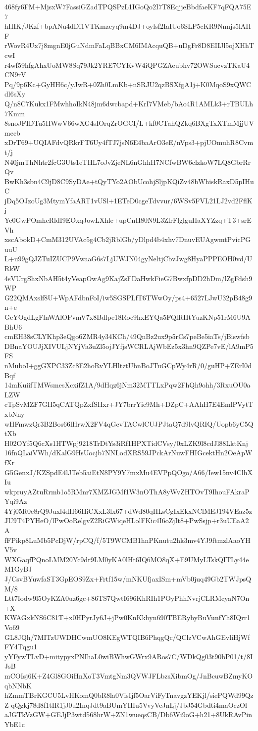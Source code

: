 468fy6FM+MjsxW7FassiGZadTPQSPzL1IGoQo2I7T8EqjjeBbdfaeKF7qFQA75E7
hHIK/JKzf+bpANu4dDi1VTKmzcyq9m4DJ+oylsf2IaIUo6SLP5cKR9Nnnjs5lAHF
rWovR4Ux7j8mgnE0jGuNdmFaLqBBxCM6IMAcquQB+uDgFr8D8EIIJl5ojXHhTcwI
r4wf59hfgAhxUoMW8Sq79Jk2YRE7CYKvW4iQPGZAeubhv72OWSucvzTKaU4CN9rV
Pq/9p6Kc+GyHH6c/yJwR+0Zh0LmKb+nSRJU2qzBSXfgA1j+K0MqoS9xQWCdl6sXy
Q/n8C7Kukx1FMwhhoIkN48jm6dwcbapd+KrI7VMeb/bAo4R1AMLk3+rTBULh7Kmm
8snoJFIDTu5HWwV66wXG4sIOrqZrOGCI/L+kf0CTahQZkq6BXgTxXTmMjjUVmecb
xDrT69+UQIAFdvQRkrFT6Uy4fTJ7jsN6E4baArO3eE/nVps3+pjUOmuhR8Cvmt/j
N40jmThNhtr2fcG3Uts1eTHL7oJvZjeNL6nGhhH7NCfwBW6clzkoW7LQ8GbrRrQv
BwKh3sbn4C9jD8C9SyDAe+tQyTYo2AObUcohjSljpKQiZv48bWhiskRaxD5pIHuC
jDq5OJzoUg3MtymYfaART1vUSl+1ETeD0cgeTdvvur/6WSv5FVL21LJ2vd2FflKj
Ye0GwPOmhcRldI9EOxqJowLXhle+upCnH80N9L3ZlrFlglguHaXYZzq+T3+srEVh
xscAbokD+CmM312UVAc5g4Cb2jRblGb/yDlpd4b4xhv7DnuvEUAgwmtPvicPGuuU
L+u99gQJZTuIZUCP9VwaaG6s7LjUWJN04gyNeltjCbvJwg8HyaPPPEOH0vd/URkW
4sVUrgShxNbAH5t4yVeapOwAg9KajZsFDaHwkFieG7BwxfpDD2hDm/lZgFdsh9WP
G22QMAxslf8U+WpAFdbnFoI/iw5SGSPLfT6TWwOy/ps4+6527LJwU32pB48g9n+e
GcYOgdLgFlnWAlOPvmV7x8Bdlpe18Roc9hxEYQa5FQlRHtYuzKNp51rM6U9ABhU6
cmEH38sCLYKhp3eQgo6ZMR4y34KCh/49QnBz2ux9p5rCs7peBe5iaTs/jBiswfsb
DBnaYOUJjXIVULjNYjVa3uZl5ojJYfjsWCRLAjWbEz5x3hn9QZPe7vE/lA9mP5FS
nMuboI+ggGXPC33Zc8E2hoRvYLHltztUbnBoJTuGCpWy4rR/0/guHP+ZErI0dBqf
14mKuiifTMWsmesXcxifZ1A/9dHqz6jNm32MTTLxPqw2FhQh9ohh/3RxuOU0aLZW
cTpSvMZF7GH5qCATQpZxfSHxr+JY7brrYic9Mh+DZpC+AAhH7E4EmlPVytTxbNny
wHFmwzQr3B2Bos66lHrwX2FV4qGcvTACwlCUJPJtaQ7d9lvQRIQ/Uopb6yC5QtXb
H02OYf5Q6cXs1HTWpj9218TrDtYs3iRf1HPXTidCVsy/0xLZK9l8cdJl88LktKnj
16fnQLaiVWh/dKalG9HsUocjb7NNLodXRS59JPckArNuwFHIGcektHn2OeApWfXr
G5GenxJ/KZSpdE4lJTeb5aiEtN8PY9Y7mxMu4EVPpQOgo/A66/Iew15nv4ClhXIu
wkpruyAZtuRrmb1o5RMnr7XMZJGMf1W3nOThA8yWvZHTOvT9IhouFAkraPYqi9Az
4Yj05R0e8rQ9Juxl4dH66HiCXxL3lx67+dWd80qHLsCgIxEkxNClMEJ194VEaz5z
JU9T4PYHeO/lPwOoRelgvZ2RiGWiqeHLolFKic4I6oZjIt8+PwSsjp+r3uUEaA2A
fFPikp8LuMb5PcDjW/rpCQ/f/5T9WCMB1hnPKnutu2hk3mv4YJ9ftmzlAaoYHV5v
WXGaqfPQnoLMM20Yc9dr9LM0yKA0lHt6IQ6MO8qX+E9UMyLTskQITLy44eM1GyBJ
J/CsvBYuwfaST3GpEOS9Zx+Frtf15w/mNKUfjaxISm+mVb0juq49Gb2TWJpsQM/8
Ltt7Iodw9l5OyKZA0uz6gc+86TS7QwtI696KhRIh1POyPhhNvrjCLRMcyaN7On+X
KWAGxkNS6C81T+x0HPyrJy6J+jPw0KnKkbyn690TBERybyBuVunfYh8IQrr1Vo69
GL8JQh/7MITzUWDHCwmUO8KEgWTQIB6PhqgQc/QClzVCwAhGEvliHjWfFY4Tqgu1
yYFywTLvD+mitypyxPNIhaL0wiBWhwGWrx9ARos7C/WDkQg03t90bP01/t/8IJsB
mCOIsj6K+Z4Gl8GOiHnXoT3VmtgNm3QVWJFLbzsXibmOg/JnBcuwBZmyKOqbNNbK
hZmmTBrKGCU5LvHKomQ0bR8la0VisIjf5OarViFyTnavgzYEKjl/siePQWd99QzZ
qQgkj78d8f1tIR1jJ0u2InqJdt9aBUmYHIu5VvyVeJnLj/JbJ54Gbdti4maOczOl
aJGTkVzGW+GEJjP3wtd568hrW+ZN1wueqsCB/Db6Wi9oG+h21+8UkRAvPinYbE1c
